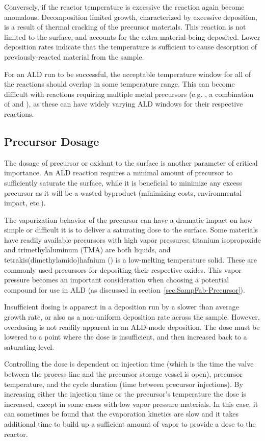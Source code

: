 Conversely, if the reactor temperature is excessive the reaction again become anomalous. Decomposition limited growth, characterized by excessive deposition, is a result of thermal cracking of the precursor materials. This reaction is not limited to the surface, and accounts for the extra material being deposited. Lower deposition rates indicate that the temperature is sufficient to cause desorption of previously-reacted material from the sample. 

For an ALD run to be successful, the acceptable temperature window for all of the reactions should overlap in some temperature range. This can become difficult with reactions requiring multiple metal precursors (e.g. \PTO, a combination of  and ), as these can have widely varying ALD windows for their respective reactions. 


\subsection{Precursor Dosage}

The dosage of precursor or oxidant to the surface is another parameter of critical importance. An ALD reaction requires a minimal amount of precursor to sufficiently saturate the surface, while it is beneficial to minimize any excess precursor as it will be a wasted byproduct (minimizing costs, environmental impact, etc.). 

The vaporization behavior of the precursor can have a dramatic impact on how simple or difficult it is to deliver a saturating dose to the surface. Some materials have readily available precursors with high vapor pressures; titanium isopropoxide and trimethylaluminum (TMA) are both liquids, and tetrakis(dimethylamido)hafnium () is a low-melting temperature solid. These are commonly used precursors for depositing their respective oxides. This vapor pressure becomes an important consideration when choosing a potential compound for use in ALD (as discussed in section~\vref{sec:SampFab-Precursor}).

Insufficient dosing is apparent in a deposition run by a slower than average growth rate, or also as a non-uniform deposition rate across the sample. However, overdosing is not readily apparent in an ALD-mode deposition. The dose must be lowered to a point where the dose is insufficient, and then increased back to a saturating level. 

Controlling the dose is dependent on injection time (which is the time the valve between the process line and the precursor storage vessel is open), precursor temperature, and the cycle duration (time between precursor injections). By increasing either the injection time or the precursor's temperature the dose is increased, except in some cases with low vapor pressure materials. In this case, it can sometimes be found that the evaporation kinetics are slow and it takes additional time to build up a sufficient amount of vapor to provide a dose to the reactor. 

